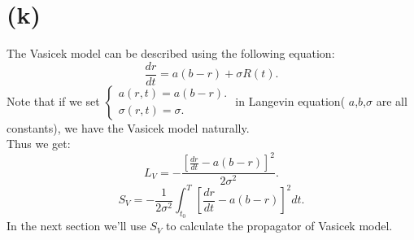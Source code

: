 \documentclass[12pt,a4paper]{paper}
\begin{document}
\section{(k)}
The Vasicek model can be described using the following equation:
\begin{equation}
\frac{dr}{dt}=a(b-r)+\sigma R(t).
\end{equation}
\indent Note that if we set 
$\left\{\begin{matrix}
a(r,t)=a(b-r).\\
\sigma (r,t)=\sigma .
\end{matrix}\right.$ in Langevin equation( $a$,$b$,$\sigma$ are all constants), we have the Vasicek model naturally.\\
\indent Thus we get:
\begin{equation}
L_{V}=-\frac{[\frac{dr}{dt}-a(b-r)]^2}{2\sigma ^2}.
\end{equation}
\begin{equation}
S_{V}=-\frac{1}{2\sigma ^2}\int_{t_0}^{T}[\frac{dr}{dt}-a(b-r)]^2 dt.
\end{equation}
In the next section we'll use $S_{V}$ to calculate the propagator of Vasicek model.
\end{document}
